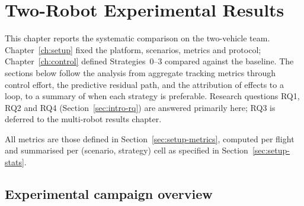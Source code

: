 %
%
%

\chapter{Two-Robot Experimental Results}
\label{ch:results2}

This chapter reports the systematic comparison on the two-vehicle team. Chapter~\ref{ch:setup}
fixed the platform, scenarios, metrics and protocol; Chapter~\ref{ch:control}
defined Strategies~0--3 compared against the baseline. The sections below follow the analysis
from aggregate tracking metrics through control effort, the predictive residual path, and the
attribution of effects to a loop, to a summary of when each strategy is preferable. Research
questions RQ1, RQ2 and RQ4 (Section~\ref{sec:intro-rq}) are answered primarily here; RQ3 is
deferred to the multi-robot results chapter.

All metrics are those defined in Section~\ref{sec:setup-metrics}, computed per flight and summarised
per (scenario, strategy) cell as specified in Section~\ref{sec:setup-stats}.

\section{Experimental campaign overview}
\label{sec:res2-overview}

